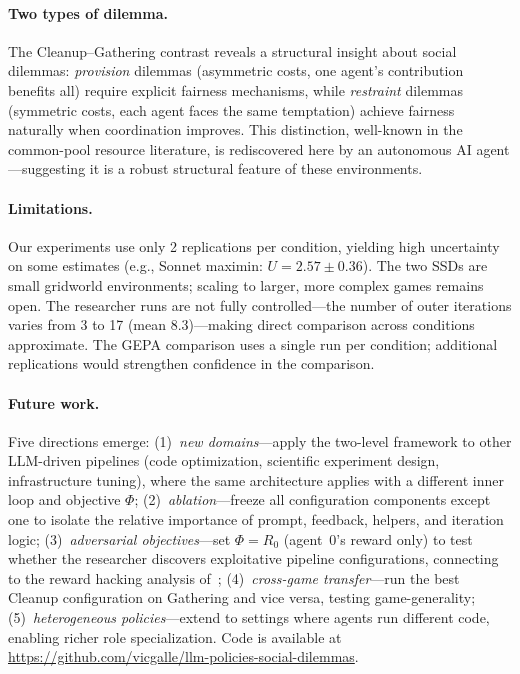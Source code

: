 \documentclass[10pt,twocolumn]{article}
\begin{document}
\paragraph{Two types of dilemma.}
The Cleanup--Gathering contrast reveals a structural insight about social dilemmas: \emph{provision} dilemmas (asymmetric costs, one agent's contribution benefits all) require explicit fairness mechanisms, while \emph{restraint} dilemmas (symmetric costs, each agent faces the same temptation) achieve fairness naturally when coordination improves. This distinction, well-known in the common-pool resource literature, is rediscovered here by an autonomous AI agent---suggesting it is a robust structural feature of these environments.

\paragraph{Limitations.}
Our experiments use only 2 replications per condition, yielding high uncertainty on some estimates (e.g., Sonnet maximin: $U{=}2.57 \pm 0.36$). The two SSDs are small gridworld environments; scaling to larger, more complex games remains open. The researcher runs are not fully controlled---the number of outer iterations varies from 3 to 17 (mean 8.3)---making direct comparison across conditions approximate. The GEPA comparison uses a single run per condition; additional replications would strengthen confidence in the comparison.

\paragraph{Future work.}
Five directions emerge: (1)~\emph{new domains}---apply the two-level framework to other LLM-driven pipelines (code optimization, scientific experiment design, infrastructure tuning), where the same architecture applies with a different inner loop and objective $\Phi$; (2)~\emph{ablation}---freeze all configuration components except one to isolate the relative importance of prompt, feedback, helpers, and iteration logic; (3)~\emph{adversarial objectives}---set $\Phi = R_0$ (agent~0's reward only) to test whether the researcher discovers exploitative pipeline configurations, connecting to the reward hacking analysis of~\cite{gallego2026}; (4)~\emph{cross-game transfer}---run the best Cleanup configuration on Gathering and vice versa, testing game-generality; (5)~\emph{heterogeneous policies}---extend to settings where agents run different code, enabling richer role specialization. Code is available at \url{https://github.com/vicgalle/llm-policies-social-dilemmas}.
\end{document}
